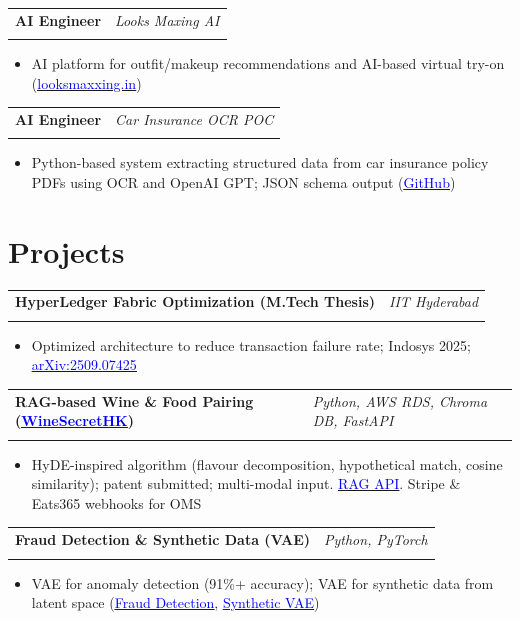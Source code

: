 \documentclass[11pt,a4paper]{article}
\makeatletter
\let\oldhref\href
\renewcommand{\href}[2]{\oldhref{#1}{\underline{\textcolor{blue}{#2}}}}
\newcommand{\resumeItem}[1]{\item\small{#1}}
\newlength{\resumeLeftCol}
\newlength{\resumeRightCol}
\newcommand{\resumeHeading}[4]{
  \begin{tabular*}{\textwidth}{@{}p{\resumeLeftCol}@{\extracolsep{\fill}}>{\raggedleft\arraybackslash}p{\resumeRightCol}@{}}
    \textbf{#1} & \textit{#2} \\
    & \textit{\ifstrempty{#4}{#3}{#3 \ #4}}
  \end{tabular*}
  \vspace{-2pt}
}
\makeatother
\begin{document}
\resumeHeading{AI Engineer}{Looks Maxing AI}{Freelance}{}
\begin{itemize}[leftmargin=*,noitemsep,topsep=0pt]
    \resumeItem{AI platform for outfit/makeup recommendations and AI-based virtual try-on (\href{https://www.looksmaxxing.in/}{looksmaxxing.in})}
\end{itemize}

\resumeHeading{AI Engineer}{Car Insurance OCR POC}{Freelance}{}
\begin{itemize}[leftmargin=*,noitemsep,topsep=0pt]
    \resumeItem{Python-based system extracting structured data from car insurance policy PDFs using OCR and OpenAI GPT; JSON schema output (\href{https://github.com/kaulmesanyam/ocr-extractor}{GitHub})}
\end{itemize}

\section{Projects}
\resumeHeading{HyperLedger Fabric Optimization (M.Tech Thesis)}{IIT Hyderabad}{2024--2025}{}
\begin{itemize}[leftmargin=*,noitemsep,topsep=0pt]
    \resumeItem{Optimized architecture to reduce transaction failure rate; Indosys 2025; \href{https://arxiv.org/abs/2509.07425}{arXiv:2509.07425}}
\end{itemize}

\resumeHeading{RAG-based Wine \& Food Pairing (\href{https://www.winesecrethk.com/}{WineSecretHK})}{Python, AWS RDS, Chroma DB, FastAPI}{}{}
\begin{itemize}[leftmargin=*,noitemsep,topsep=0pt]
    \resumeItem{HyDE-inspired algorithm (flavour decomposition, hypothetical match, cosine similarity); patent submitted; multi-modal input. \href{https://rag.winesecrethk.com/docs}{RAG API}. Stripe \& Eats365 webhooks for OMS}
\end{itemize}

\resumeHeading{Fraud Detection \& Synthetic Data (VAE)}{Python, PyTorch}{}{}
\begin{itemize}[leftmargin=*,noitemsep,topsep=0pt]
    \resumeItem{VAE for anomaly detection (91\%+ accuracy); VAE for synthetic data from latent space (\href{https://github.com/kaulmesanyam/IITH_MTech/blob/main/Sem_2/Fraud_Analytics/Fraud_Detection_Using_an_Autoencoder_and_Variational_Autoencoder.zip}{Fraud Detection}, \href{https://github.com/kaulmesanyam/IITH_MTech/blob/main/Sem_2/Fraud_Analytics/Synthetic_data_generation_usin_Variational_Autoencoder.zip}{Synthetic VAE})}
\end{itemize}
\end{document}
